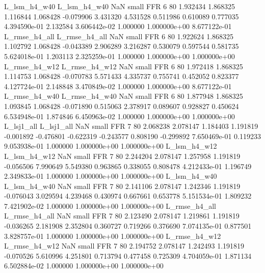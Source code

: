  L_lsm_h4_w40  L_lsm_h4_w40                   NaN      small      FFR                 6 80 1.932434       1.868325 1.116844       1.068428   -0.079906      3.431320      4.531528     0.511986       0.610089  0.777035 4.394590e-01     2.132584   3.606442e-02            1.000000    1.000000e+00        8.677122e-01
L_rmse_h4_all L_rmse_h4_all                   NaN      small      FFR                 6 80 1.922624       1.868325 1.102792       1.068428   -0.043389      2.906289      3.216287     0.530079       0.597544  0.581735 5.624018e-01     1.203113   2.325259e-01            1.000000    1.000000e+00        1.000000e+00
L_rmse_h4_w12 L_rmse_h4_w12                   NaN      small      FFR                 6 80 1.972418       1.868325 1.114753       1.068428   -0.070783      5.571433      4.335737     0.755741       0.452052  0.823377 4.127724e-01     2.148848   3.470849e-02            1.000000    1.000000e+00        8.677122e-01
L_rmse_h4_w40 L_rmse_h4_w40                   NaN      small      FFR                 6 80 1.877948       1.868325 1.093845       1.068428   -0.071890      0.515063      2.378917     0.089607       0.928827  0.450624 6.534948e-01     1.874846   6.450963e-02            1.000000    1.000000e+00        1.000000e+00
   L_lsj1_all    L_lsj1_all                   NaN      small      FFR                 7 80 2.068238       2.078147 1.184403       1.191819   -0.001892     -0.476801     -0.622319    -0.243577       0.808190 -0.299892 7.650469e-01     0.119233   9.053938e-01            1.000000    1.000000e+00        1.000000e+00
 L_lsm_h4_w12  L_lsm_h4_w12                   NaN      small      FFR                 7 80 2.244204       2.078147 1.257958       1.191819   -0.056506      7.990649      5.549380     0.963865       0.338055  0.808478 4.212433e-01     1.196749   2.349833e-01            1.000000    1.000000e+00        1.000000e+00
 L_lsm_h4_w40  L_lsm_h4_w40                   NaN      small      FFR                 7 80 2.141106       2.078147 1.242346       1.191819   -0.076043      3.029594      4.239468     0.430974       0.667661  0.653778 5.151534e-01     1.809232   7.421902e-02            1.000000    1.000000e+00        1.000000e+00
L_rmse_h4_all L_rmse_h4_all                   NaN      small      FFR                 7 80 2.123490       2.078147 1.219861       1.191819   -0.036265      2.181908      2.352804     0.360727       0.719266  0.376690 7.074135e-01     0.877501   3.828757e-01            1.000000    1.000000e+00        1.000000e+00
L_rmse_h4_w12 L_rmse_h4_w12                   NaN      small      FFR                 7 80 2.194752       2.078147 1.242493       1.191819   -0.070526      5.610996      4.251801     0.713794       0.477458  0.725309 4.704059e-01     1.871134   6.502884e-02            1.000000    1.000000e+00        1.000000e+00
